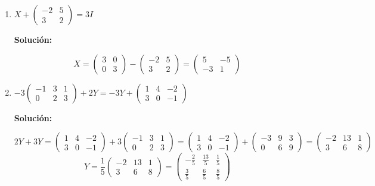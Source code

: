 \documentclass[12pt]{article}
\newcommand{\solucion}{%
    \vspace{0.8em}%
    \textbf{Solución:}%
}
\begin{document}
\begin{enumerate}[label=\alph*.-]
    \item $X + \begin{pmatrix} -2 & 5 \\ 3 & 2 \end{pmatrix} = 3I$

    \solucion
    \[
    X = \begin{pmatrix}3&0\\0&3\end{pmatrix} - \begin{pmatrix}-2&5\\3&2\end{pmatrix}
    = \begin{pmatrix}5&-5\\-3&1\end{pmatrix}
    \]

    \item $-3\begin{pmatrix} -1 & 3 & 1 \\ 0 & 2 & 3 \end{pmatrix} + 2Y = -3Y + \begin{pmatrix} 1 & 4 & -2 \\ 3 & 0 & -1 \end{pmatrix}$

    \solucion
    \[
    2Y + 3Y = \begin{pmatrix}1&4&-2\\3&0&-1\end{pmatrix} + 3\begin{pmatrix}-1&3&1\\0&2&3\end{pmatrix}
    = \begin{pmatrix}1&4&-2\\3&0&-1\end{pmatrix} + \begin{pmatrix}-3&9&3\\0&6&9\end{pmatrix}
    = \begin{pmatrix}-2&13&1\\3&6&8\end{pmatrix}
    \]
    \[
    Y = \frac{1}{5}\begin{pmatrix}-2&13&1\\3&6&8\end{pmatrix}
    = \begin{pmatrix}-\frac{2}{5}&\frac{13}{5}&\frac{1}{5}\\[4pt]\frac{3}{5}&\frac{6}{5}&\frac{8}{5}\end{pmatrix}
    \]


\end{enumerate}
\end{document}
